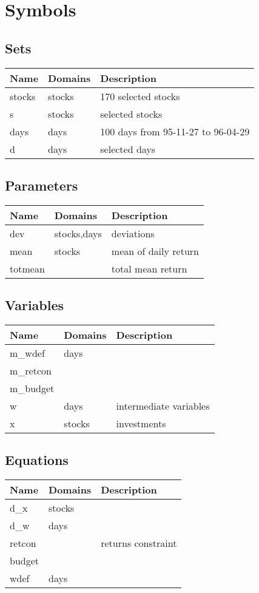 \documentclass[11pt]{article}
\begin{document}
\section*{Symbols}


\subsection*{Sets}
\begin{tabularx}{\textwidth}{| l | l | X |}
\hline
\textbf{Name} & \textbf{Domains} & \textbf{Description}\\
\hline
\endhead

stocks & stocks & 170 selected stocks\\
s & stocks & selected stocks\\
days & days & 100 days from 95-11-27 to 96-04-29\\
d & days & selected days\\
\hline
\end{tabularx}
\subsection*{Parameters}
\begin{tabularx}{\textwidth}{| l | l | X |}
\hline
\textbf{Name} & \textbf{Domains} & \textbf{Description}\\
\hline
\endhead

dev & stocks,days & deviations\\
mean & stocks & mean of daily return\\
totmean &  & total mean return\\
\hline
\end{tabularx}
\subsection*{Variables}
\begin{tabularx}{\textwidth}{| l | l | X |}
\hline
\textbf{Name} & \textbf{Domains} & \textbf{Description}\\
\hline
\endhead

m\_wdef & days & \\
m\_retcon &  & \\
m\_budget &  & \\
w & days & intermediate variables\\
x & stocks & investments\\
\hline
\end{tabularx}
\subsection*{Equations}
\begin{tabularx}{\textwidth}{| l | l | X |}
\hline
\textbf{Name} & \textbf{Domains} & \textbf{Description}\\
\hline
\endhead

d\_x & stocks & \\
d\_w & days & \\
retcon &  & returns constraint\\
budget &  & \\
wdef & days & \\
\hline
\end{tabularx}
\end{document}
